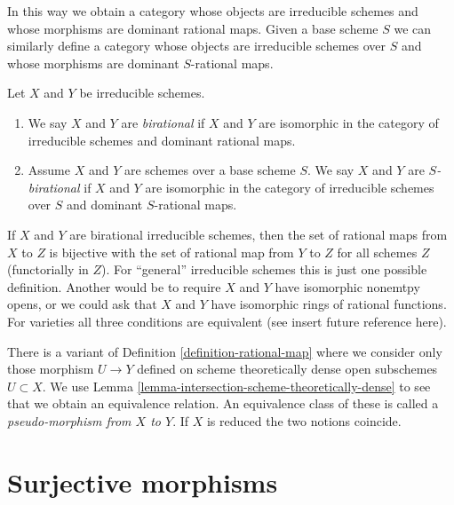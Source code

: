 \medskip\noindent
In this way we obtain a category whose objects are irreducible schemes
and whose morphisms are dominant rational maps. Given a base scheme
$S$ we can similarly define a category whose objects are irreducible schemes
over $S$ and whose morphisms are dominant $S$-rational maps.

\begin{definition}
\label{definition-birational-schemes}
Let $X$ and $Y$ be irreducible schemes.
\begin{enumerate}
\item We say $X$ and $Y$ are {\it birational} if $X$ and $Y$ are isomorphic
in the category of irreducible schemes and dominant rational maps.
\item Assume $X$ and $Y$ are schemes over a base scheme $S$.
We say $X$ and $Y$ are {\it $S$-birational} if $X$ and $Y$ are
isomorphic in the category of irreducible schemes over $S$ and
dominant $S$-rational maps.
\end{enumerate}
\end{definition}

\noindent
If $X$ and $Y$ are birational irreducible schemes, then the set of rational
maps from $X$ to $Z$ is bijective with the set of rational map from $Y$ to $Z$
for all schemes $Z$ (functorially in $Z$). For ``general'' irreducible schemes
this is just one possible definition. Another would be
to require $X$ and $Y$ have isomorphic nonemtpy opens, or we could
ask that $X$ and $Y$ have isomorphic rings of rational functions. For
varieties all three conditions are equivalent (see insert future reference
here).

\begin{remark}
\label{remark-pseudo-morphisms}
There is a variant of Definition \ref{definition-rational-map}
where we consider only those morphism $U \to Y$ defined on
scheme theoretically dense open subschemes $U \subset X$.
We use Lemma \ref{lemma-intersection-scheme-theoretically-dense}
to see that we obtain an equivalence relation.
An equivalence class of these is called a
{\it pseudo-morphism from $X$ to $Y$}.
If $X$ is reduced the two notions coincide.
\end{remark}








\section{Surjective morphisms}
\label{section-surjective}

